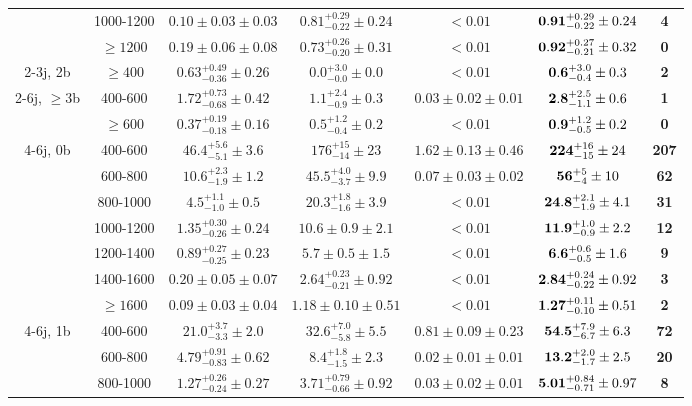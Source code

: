 \begin{table}[!ht]
{\begin{tabular}{c|c||c|c|c|c|c}
 & 1000-1200 & $0.10\pm0.03\pm0.03$ & $0.81^{+0.29}_{-0.22}\pm0.24$ & $<0.01$ & ${\bf 0.91}^{+0.29}_{-0.22}\pm0.24$ & {\bf 4}\\ 
 & $\geq1200$ & $0.19\pm0.06\pm0.08$ & $0.73^{+0.26}_{-0.20}\pm0.31$ & $<0.01$ & ${\bf 0.92}^{+0.27}_{-0.21}\pm0.32$ & {\bf 0}\\ 
\hline
\multirow{1}{*}{2-3j, 2b} & $\geq400$ & $0.63^{+0.49}_{-0.36}\pm0.26$ & $0.0^{+3.0}_{-0.0}\pm0.0$ & $<0.01$ & ${\bf 0.6}^{+3.0}_{-0.4}\pm0.3$ & {\bf 2}\\ 
\hline
\multirow{2}{*}{2-6j, $\geq3$b} & 400-600 & $1.72^{+0.73}_{-0.68}\pm0.42$ & $1.1^{+2.4}_{-0.9}\pm0.3$ & $0.03\pm0.02\pm0.01$ & ${\bf 2.8}^{+2.5}_{-1.1}\pm0.6$ & {\bf 1}\\ 
 & $\geq600$ & $0.37^{+0.19}_{-0.18}\pm0.16$ & $0.5^{+1.2}_{-0.4}\pm0.2$ & $<0.01$ & ${\bf 0.9}^{+1.2}_{-0.5}\pm0.2$ & {\bf 0}\\ 
\hline
\multirow{7}{*}{4-6j, 0b} & 400-600 & $46.4^{+5.6}_{-5.1}\pm3.6$ & $176^{+15}_{-14}\pm23$ & $1.62\pm0.13\pm0.46$ & ${\bf 224}^{+16}_{-15}\pm24$ & {\bf 207}\\ 
 & 600-800 & $10.6^{+2.3}_{-1.9}\pm1.2$ & $45.5^{+4.0}_{-3.7}\pm9.9$ & $0.07\pm0.03\pm0.02$ & ${\bf 56}^{+5}_{-4}\pm10$ & {\bf 62}\\ 
 & 800-1000 & $4.5^{+1.1}_{-1.0}\pm0.5$ & $20.3^{+1.8}_{-1.6}\pm3.9$ & $<0.01$ & ${\bf 24.8}^{+2.1}_{-1.9}\pm4.1$ & {\bf 31}\\ 
 & 1000-1200 & $1.35^{+0.30}_{-0.26}\pm0.24$ & $10.6\pm0.9\pm2.1$ & $<0.01$ & ${\bf 11.9}^{+1.0}_{-0.9}\pm2.2$ & {\bf 12}\\ 
 & 1200-1400 & $0.89^{+0.27}_{-0.25}\pm0.23$ & $5.7\pm0.5\pm1.5$ & $<0.01$ & ${\bf 6.6}^{+0.6}_{-0.5}\pm1.6$ & {\bf 9}\\ 
 & 1400-1600 & $0.20\pm0.05\pm0.07$ & $2.64^{+0.23}_{-0.21}\pm0.92$ & $<0.01$ & ${\bf 2.84}^{+0.24}_{-0.22}\pm0.92$ & {\bf 3}\\ 
 & $\geq1600$ & $0.09\pm0.03\pm0.04$ & $1.18\pm0.10\pm0.51$ & $<0.01$ & ${\bf 1.27}^{+0.11}_{-0.10}\pm0.51$ & {\bf 2}\\ 
\hline
\multirow{5}{*}{4-6j, 1b} & 400-600 & $21.0^{+3.7}_{-3.3}\pm2.0$ & $32.6^{+7.0}_{-5.8}\pm5.5$ & $0.81\pm0.09\pm0.23$ & ${\bf 54.5}^{+7.9}_{-6.7}\pm6.3$ & {\bf 72}\\ 
 & 600-800 & $4.79^{+0.91}_{-0.83}\pm0.62$ & $8.4^{+1.8}_{-1.5}\pm2.3$ & $0.02\pm0.01\pm0.01$ & ${\bf 13.2}^{+2.0}_{-1.7}\pm2.5$ & {\bf 20}\\ 
 & 800-1000 & $1.27^{+0.26}_{-0.24}\pm0.27$ & $3.71^{+0.79}_{-0.66}\pm0.92$ & $0.03\pm0.02\pm0.01$ & ${\bf 5.01}^{+0.84}_{-0.71}\pm0.97$ & {\bf 8}\\ 

\end{tabular}}
\end{table}
